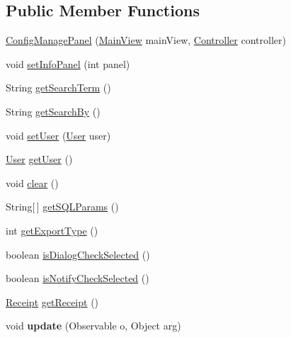 \subsection*{Public Member Functions}
\begin{DoxyCompactItemize}
\item 
\hyperlink{classw3se_1_1_view_1_1_panels_1_1_config_manage_panel_a2d209c0324f96e55cc72339a3d54a8a7}{Config\-Manage\-Panel} (\hyperlink{classw3se_1_1_view_1_1_main_view}{Main\-View} main\-View, \hyperlink{interfacew3se_1_1_controller_1_1_controller}{Controller} controller)
\item 
void \hyperlink{classw3se_1_1_view_1_1_panels_1_1_config_manage_panel_ab9603390787aec504fd1f2251dbbbf93}{set\-Info\-Panel} (int panel)
\item 
String \hyperlink{classw3se_1_1_view_1_1_panels_1_1_config_manage_panel_a3a32922379c312ce8ff88e70800f915f}{get\-Search\-Term} ()
\item 
String \hyperlink{classw3se_1_1_view_1_1_panels_1_1_config_manage_panel_ad057d73f355e4c1453c90c0d30ceddf3}{get\-Search\-By} ()
\item 
void \hyperlink{classw3se_1_1_view_1_1_panels_1_1_config_manage_panel_a8f7a1d3a78fbb6cb3df7df56d0c1dd69}{set\-User} (\hyperlink{classw3se_1_1_model_1_1_base_1_1_user}{User} user)
\item 
\hyperlink{classw3se_1_1_model_1_1_base_1_1_user}{User} \hyperlink{classw3se_1_1_view_1_1_panels_1_1_config_manage_panel_a3c7474965efc55e75bd42ec88e8a455f}{get\-User} ()
\item 
void \hyperlink{classw3se_1_1_view_1_1_panels_1_1_config_manage_panel_a2b5fd0f05ce95861a83bbcfb2df54a0d}{clear} ()
\item 
String\mbox{[}$\,$\mbox{]} \hyperlink{classw3se_1_1_view_1_1_panels_1_1_config_manage_panel_a0a064fd2d1550cfd940afe894c5970a9}{get\-S\-Q\-L\-Params} ()
\item 
int \hyperlink{classw3se_1_1_view_1_1_panels_1_1_config_manage_panel_a31c87933c179dac3a1ae9c6b1554bf7b}{get\-Export\-Type} ()
\item 
boolean \hyperlink{classw3se_1_1_view_1_1_panels_1_1_config_manage_panel_a14a341a6f842e9480968eb6815465ad8}{is\-Dialog\-Check\-Selected} ()
\item 
boolean \hyperlink{classw3se_1_1_view_1_1_panels_1_1_config_manage_panel_aa95857f15b4d4c827fab111f226e9539}{is\-Notify\-Check\-Selected} ()
\item 
\hyperlink{classw3se_1_1_model_1_1_base_1_1_receipt}{Receipt} \hyperlink{classw3se_1_1_view_1_1_panels_1_1_config_manage_panel_a4808b9557b8ebb1808789f64f77b9d2e}{get\-Receipt} ()
\item 
\hypertarget{classw3se_1_1_view_1_1_panels_1_1_config_manage_panel_aa6a64005c51292d070b5c28d2f52eb97}{void {\bfseries update} (Observable o, Object arg)}\label{classw3se_1_1_view_1_1_panels_1_1_config_manage_panel_aa6a64005c51292d070b5c28d2f52eb97}

\end{DoxyCompactItemize}
